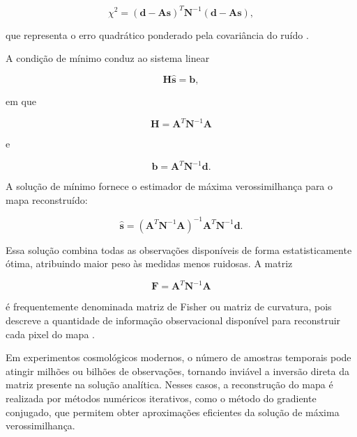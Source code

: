 \begin{equation}
\chi^2=
(\mathbf d-\mathbf A\mathbf s)^T
\mathbf N^{-1}
(\mathbf d-\mathbf A\mathbf s),
\label{função_custos}
\end{equation}

que representa o erro quadrático ponderado pela covariância do ruído \cite{tegmark1997mapmaking}.

A condição de mínimo conduz ao sistema linear

\begin{equation}
\mathbf H\hat{\mathbf s}=\mathbf b,
\label{sistema_linear}
\end{equation}

em que

\begin{equation}
\mathbf H=\mathbf A^T\mathbf N^{-1}\mathbf A
\end{equation}

e

\begin{equation}
\mathbf b=\mathbf A^T\mathbf N^{-1}\mathbf d.
\end{equation}

A solução de mínimo fornece o estimador de máxima verossimilhança para o mapa reconstruído:

\begin{equation}
\hat{\mathbf s}
=
(\mathbf A^T\mathbf N^{-1}\mathbf A)^{-1}
\mathbf A^T\mathbf N^{-1}\mathbf d.
\label{eq:mapa_reconstruido}
\end{equation}

Essa solução combina todas as observações disponíveis de forma estatisticamente ótima, atribuindo maior peso às medidas menos ruidosas. A matriz

\begin{equation}
\mathbf F =
\mathbf A^T
\mathbf N^{-1}
\mathbf A
\end{equation}

é frequentemente denominada matriz de Fisher ou matriz de curvatura, pois descreve a quantidade de informação observacional disponível para reconstruir cada pixel do mapa \cite{tegmark1997mapmaking}.

Em experimentos cosmológicos modernos, o número de amostras temporais pode atingir milhões ou bilhões de observações, tornando inviável a inversão direta da matriz presente na solução analítica. Nesses casos, a reconstrução do mapa é realizada por métodos numéricos iterativos, como o método do gradiente conjugado, que permitem obter aproximações eficientes da solução de máxima verossimilhança.

